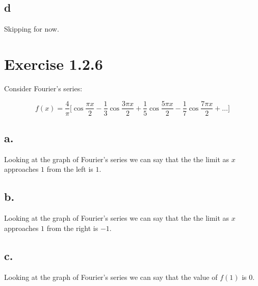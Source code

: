 \documentclass{article}
\begin{document}
\subsection*{d}
Skipping for now.


\newpage
\section*{Exercise 1.2.6}

Consider Fourier's series:

\begin{equation*}
        f(x) = \frac{4}{\pi}\Big[\cos \frac{\pi x}{2} - \frac{1}{3} \cos \frac{3\pi x}{2} + \frac{1}{5} \cos \frac{5\pi x}{2} - \frac{1}{7} \cos \frac{7\pi x}{2} + \dots \Big]
\end{equation*}


\subsection*{a.}

Looking at the graph of Fourier's series we can say that the the limit as
\(x\) approaches \(1\) from the left is \(1\).

\subsection*{b.}

Looking at the graph of Fourier's series we can say that the the limit as
\(x\) approaches \(1\) from the right is \(-1\).

\subsection*{c.}

Looking at the graph of Fourier's series we can say that the value of \(f(1)\)
is \(0\).
\end{document}
